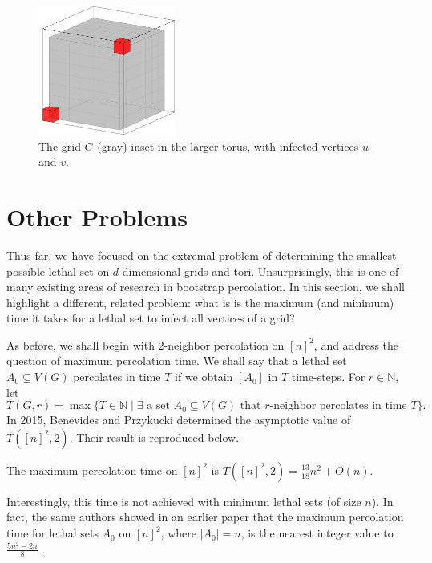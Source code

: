 \begin{figure}[]
\centering
\includegraphics[width=0.4\textwidth]{figures/1/torus.pdf}
\caption{The grid $G$ (gray) inset in the larger torus, with infected vertices $u$ and $v$.}
\label{fig:torus}
\end{figure} 

\section{Other Problems}

Thus far, we have focused on the extremal problem of determining the smallest possible lethal set on $d$-dimensional grids and tori. Unsurprisingly, this is one of many existing areas of research in bootstrap percolation. In this section, we shall highlight a different, related problem: what is is the maximum (and minimum) time it takes for a lethal set to infect all vertices of a grid?

As before, we shall begin with $2$-neighbor percolation on $[n]^2$, and address the question of maximum percolation time. We shall say that a lethal set $A_0 \subseteq V(G)$ percolates in time $T$ if we obtain $[A_0]$ in $T$ time-steps. For $r \in \mathbb{N}$, let
$$T(G,r) = \max\{T \in \mathbb{N} \mid \exists \text{ a set }A_0 \subseteq V(G)\text{ that }r\text{-neighbor percolates in time }T\}.$$
In 2015, Benevides and Przykucki \cite{benevides2015maximum} determined the asymptotic value of $T([n]^2,2)$. Their result is reproduced below.

\begin{thm}
The maximum percolation time on $[n]^2$ is $T([n]^2,2) = \frac{13}{18}n^2 + O(n)$. 
\end{thm}

Interestingly, this time is not achieved with minimum lethal sets (of size $n$). In fact, the same authors showed in an earlier paper that the maximum percolation time for lethal sets $A_0$ on $[n]^2$, where $|A_0| = n$, is the nearest integer value to $\frac{5n^2-2n}{8}$ \cite{benevides2013slowly}. 

